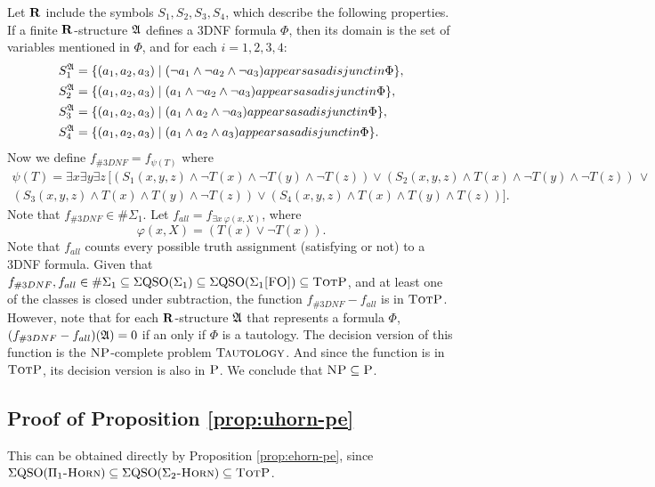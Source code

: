 Let $\mathbf{R}$ include the symbols $S_1, S_2, S_3, S_4$, which describe the following properties. If a finite $\mathbf{R}$-structure $\mathfrak{A}$ defines a 3DNF formula $\Phi$, then its domain is the set of variables mentioned in $\Phi$, and for each $i = 1,2,3,4$:
\begin{align*}
	S_1^{\mathfrak{A}} &= \{(a_1,a_2,a_3)\mid (\neg a_1 \wedge \neg a_2 \wedge \neg a_3) \relax{ appears as a disjunct in }\Phi\},\\
	S_2^{\mathfrak{A}} &= \{(a_1,a_2,a_3)\mid ( a_1 \wedge \neg a_2 \wedge \neg a_3) \relax{ appears as a disjunct in }\Phi\},\\
	S_3^{\mathfrak{A}} &= \{(a_1,a_2,a_3)\mid ( a_1 \wedge  a_2 \wedge \neg a_3) \relax{ appears as a disjunct in }\Phi\},\\
	S_4^{\mathfrak{A}} &= \{(a_1,a_2,a_3)\mid ( a_1 \wedge  a_2 \wedge  a_3) \relax{ appears as a disjunct in }\Phi\}.
\end{align*}
Now we define $f_{\#3DNF} = f_{\psi(T)}$ where
\begin{multline*}
\psi(T) = \exists x \exists y \exists z\, [(S_1(x,y,z) \wedge \neg T(x) \wedge \neg T(y) \wedge \neg T(z)) \vee (S_2(x,y,z) \wedge T(x) \wedge \neg T(y) \wedge \neg T(z)) \, \vee \\ (S_3(x,y,z) \wedge T(x) \wedge T(y) \wedge \neg T(z)) \vee (S_4(x,y,z) \wedge T(x) \wedge T(y) \wedge T(z))].
\end{multline*}
Note that $f_{\#3DNF} \in \#\Sigma_1$. Let $f_{all} = f_{\exists x\:\varphi(x,X)}$, where
$$
\varphi(x,X) = (T(x) \vee \neg T(x)).
$$
Note that $f_{all}$ counts every possible truth assignment (satisfying or not) to a 3DNF formula. Given that $f_{\#3DNF}, f_{all} \in \#\Sigma_{1} \subseteq \Sigma{\rm QSO}(\Sigma_{1}) \subseteq \Sigma{\rm QSO}(\Sigma_{1}\textsc{[FO]}) \subseteq \text{\sc TotP}$, and at least one of the classes is closed under subtraction, the function $f_{\#3DNF} - f_{all}$ is in $\text{\sc TotP}$. However, note that for each $\mathbf{R}$-structure $\mathfrak{A}$ that represents a formula $\Phi$, $(f_{\#3DNF} - f_{all})(\mathfrak{A}) = 0$ if an only if $\Phi$ is a tautology. The decision version of this function is the $\text{\sc NP}$-complete problem $\textsc{Tautology}$. And since the function is in $\text{\sc TotP}$, its decision version is also in $\text{\sc P}$. We conclude that $\text{\sc NP} \subseteq \text{\sc P}$.

\subsection*{Proof of Proposition \ref{prop:uhorn-pe}} %
This can be obtained directly by Proposition \ref{prop:ehorn-pe}, since $\Sigma{\rm QSO}(\Pi_1\textsc{-Horn})\subseteq\Sigma{\rm QSO}(\Sigma_2\textsc{-Horn})\subseteq\text{\sc TotP}$.

